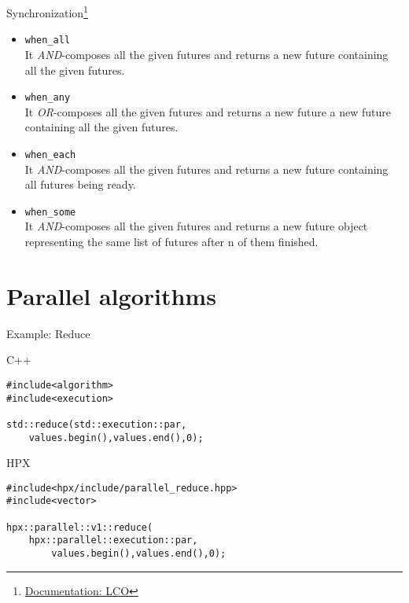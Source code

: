\documentclass[12pt,t]{beamer}
\begin{document}
\begin{frame}[fragile]{Synchronization\footnote{\tiny\href{https://stellar-group.github.io/hpx/docs/sphinx/latest/html/terminology.html\#term-lco}{Documentation: LCO}}}

\begin{itemize}
\item \lstinline|when_all| \\
It \textit{AND}-composes all the given futures and returns a new future containing all the given futures.
\item \lstinline|when_any| \\
It \textit{OR}-composes all the given futures and returns a new future a new future containing all the given futures.
\item \lstinline|when_each| \\
It \textit{AND}-composes all the given futures and returns a new future containing all futures being ready.
\item \lstinline|when_some| \\
It \textit{AND}-composes all the given futures and returns a new future object representing the same list of futures after n of them finished.

\end{itemize}

\end{frame}


\section{Parallel algorithms}


\begin{frame}[fragile]{Example: Reduce}

\begin{block}{C++}
\begin{lstlisting}
#include<algorithm>
#include<execution>

std::reduce(std::execution::par,
	values.begin(),values.end(),0);
\end{lstlisting}
\end{block}

\begin{block}{HPX}
\begin{lstlisting}
#include<hpx/include/parallel_reduce.hpp>
#include<vector>

hpx::parallel::v1::reduce(
	hpx::parallel::execution::par,
		values.begin(),values.end(),0);

\end{lstlisting}
\end{block}

\end{frame}
\end{document}
